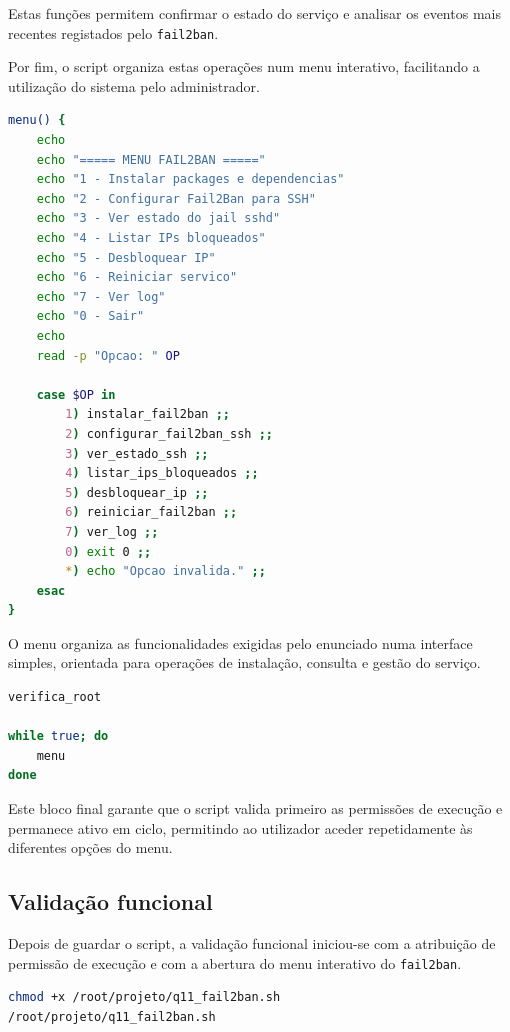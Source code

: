 Estas fun\c{c}\~oes permitem confirmar o estado do servi\c{c}o e analisar os eventos mais recentes registados pelo \texttt{fail2ban}.

Por fim, o script organiza estas opera\c{c}\~oes num menu interativo, facilitando a utiliza\c{c}\~ao do sistema pelo administrador.

\begin{lstlisting}[language=bash,caption={Menu principal do script}]
menu() {
    echo
    echo "===== MENU FAIL2BAN ====="
    echo "1 - Instalar packages e dependencias"
    echo "2 - Configurar Fail2Ban para SSH"
    echo "3 - Ver estado do jail sshd"
    echo "4 - Listar IPs bloqueados"
    echo "5 - Desbloquear IP"
    echo "6 - Reiniciar servico"
    echo "7 - Ver log"
    echo "0 - Sair"
    echo
    read -p "Opcao: " OP

    case $OP in
        1) instalar_fail2ban ;;
        2) configurar_fail2ban_ssh ;;
        3) ver_estado_ssh ;;
        4) listar_ips_bloqueados ;;
        5) desbloquear_ip ;;
        6) reiniciar_fail2ban ;;
        7) ver_log ;;
        0) exit 0 ;;
        *) echo "Opcao invalida." ;;
    esac
}
\end{lstlisting}

O menu organiza as funcionalidades exigidas pelo enunciado numa interface simples, orientada para opera\c{c}\~oes de instala\c{c}\~ao, consulta e gest\~ao do servi\c{c}o.

\begin{lstlisting}[language=bash,caption={Arranque do script em ciclo interativo}]
verifica_root

while true; do
    menu
done
\end{lstlisting}

Este bloco final garante que o script valida primeiro as permiss\~oes de execu\c{c}\~ao e permanece ativo em ciclo, permitindo ao utilizador aceder repetidamente \`as diferentes op\c{c}\~oes do menu.

\subsection{Valida\c{c}\~ao funcional}

Depois de guardar o script, a valida\c{c}\~ao funcional iniciou-se com a atribui\c{c}\~ao de permiss\~ao de execu\c{c}\~ao e com a abertura do menu interativo do \texttt{fail2ban}.

\begin{lstlisting}[language=bash,caption={Arranque do script da Questao 11}]
chmod +x /root/projeto/q11_fail2ban.sh
/root/projeto/q11_fail2ban.sh
\end{lstlisting}

